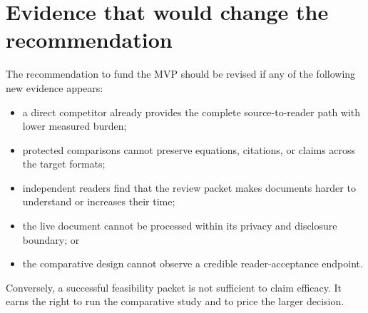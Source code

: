 \section{Evidence that would change the recommendation}

The recommendation to fund the MVP should be revised if any of the following
new evidence appears:

\begin{itemize}
\item a direct competitor already provides the complete source-to-reader path
  with lower measured burden;
\item protected comparisons cannot preserve equations, citations, or claims
  across the target formats;
\item independent readers find that the review packet makes documents harder
  to understand or increases their time;
\item the live document cannot be processed within its privacy and disclosure
  boundary; or
\item the comparative design cannot observe a credible reader-acceptance
  endpoint.
\end{itemize}

Conversely, a successful feasibility packet is not sufficient to claim
efficacy. It earns the right to run the comparative study and to price the
larger decision.
